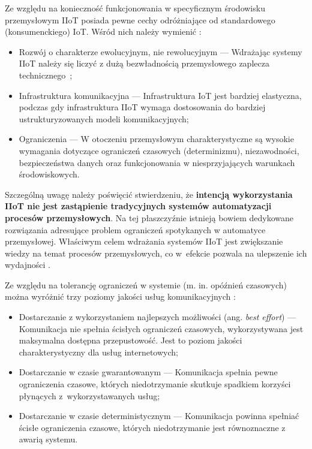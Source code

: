 \documentclass[a4paper, 12pt, twoside]{article}
\begin{document}
Ze względu na konieczność funkcjonowania w specyficznym środowisku przemysłowym
IIoT posiada pewne cechy odróżniające od standardowego (konsumenckiego) IoT.
Wśród nich należy wymienić \cite{iiot-challenges-opportunities-directions}:
\begin{itemize}
      \itemsep0em
      \item Rozwój o charakterze ewolucyjnym, nie rewolucyjnym
            --- Wdrażając systemy IIoT należy się liczyć z dużą bezwładnością
            przemysłowego zaplecza technicznego~\cite{isp};
      \item Infrastruktura komunikacyjna
            --- Infrastruktura IoT jest bardziej elastyczna, podczas gdy infrastruktura
            IIoT wymaga dostosowania do bardziej ustrukturyzowanych modeli komunikacyjnych;
      \item Ograniczenia
            --- W otoczeniu przemysłowym charakterystyczne są wysokie wymagania dotyczące
            ograniczeń czasowych (determinizmu), niezawodności, bezpieczeństwa danych oraz
            funkcjonowania w niesprzyjających warunkach środowiskowych.
\end{itemize}

Szczególną uwagę należy poświęcić stwierdzeniu, że \textbf{intencją wykorzystania IIoT nie
      jest zastąpienie tradycyjnych systemów automatyzacji procesów przemysłowych}.
Na tej płaszczyźnie istnieją bowiem dedykowane rozwiązania adresujące
problem ograniczeń spotykanych w automatyce przemysłowej.
Właściwym celem wdrażania systemów IIoT jest zwiększanie wiedzy na temat procesów
przemysłowych, co w~efekcie pozwala na ulepszenie ich wydajności \cite{iiot-challenges-opportunities-directions}.

Ze względu na tolerancję ograniczeń w systemie (m. in. opóźnień czasowych) można
wyróżnić trzy poziomy jakości usług komunikacyjnych \cite{iot-hype-to-reality}:
\begin{itemize}
      \itemsep0em
      \item Dostarczanie z wykorzystaniem najlepszych możliwości (ang. \emph{best effort})
            --- Komunikacja nie spełnia ścisłych ograniczeń czasowych, wykorzystywana jest
            maksymalna dostępna przepustowość. Jest to poziom jakości charakterystyczny
            dla usług internetowych;
      \item Dostarczanie w czasie gwarantowanym
            --- Komunikacja spełnia pewne ograniczenia czasowe, których niedotrzymanie
            skutkuje spadkiem korzyści płynących z~wykorzystawanych usług;
      \item Dostarczanie w czasie deterministycznym
            --- Komunikacja powinna spełniać ścisłe ograniczenia czasowe,
            których niedotrzymanie jest równoznaczne z awarią systemu.
\end{itemize}
\end{document}
